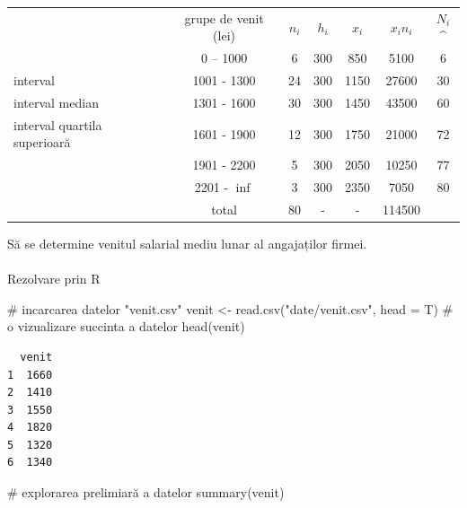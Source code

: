 \documentclass[
  11pt,
  b5paper,
  nottoc]{book}
\makeatletter
\let\oldparagraph\paragraph
\renewcommand{\paragraph}{
    \@ifstar
      \xxxParagraphStar
      \xxxParagraphNoStar
  }
\newcommand{\xxxParagraphStar}[1]{\oldparagraph*{#1}\mbox{}}
\newcommand{\xxxParagraphNoStar}[1]{\oldparagraph{#1}\mbox{}}
\newenvironment{Shaded}{\begin{snugshade}}{\end{snugshade}}
\newcommand{\AttributeTok}[1]{\textcolor[rgb]{0.40,0.45,0.13}{#1}}
\newcommand{\CommentTok}[1]{\textcolor[rgb]{0.37,0.37,0.37}{#1}}
\newcommand{\FunctionTok}[1]{\textcolor[rgb]{0.28,0.35,0.67}{#1}}
\newcommand{\NormalTok}[1]{\textcolor[rgb]{0.00,0.23,0.31}{#1}}
\newcommand{\OtherTok}[1]{\textcolor[rgb]{0.00,0.23,0.31}{#1}}
\newcommand{\StringTok}[1]{\textcolor[rgb]{0.13,0.47,0.30}{#1}}
\makeatother
\begin{document}
\begin{table}[]
\begin{tabular}{lcccccc}
                             & grupe de venit (lei) & $n_i$ & $h_i$ & $x_i$ & $x_i n_i$ & $N_i$\^ \\                              & 0 – 1000             & 6     & 300   & 850   & 5100      & 6       \\
interval                     & 1001 - 1300          & 24    & 300   & 1150  & 27600     & 30      \\
interval median              & 1301 - 1600          & 30    & 300   & 1450  & 43500     & 60      \\
interval quartila superioară & 1601 - 1900          & 12    & 300   & 1750  & 21000     & 72      \\
                             & 1901 - 2200          & 5     & 300   & 2050  & 10250     & 77      \\
                             & 2201 - $\inf$        & 3     & 300   & 2350  & 7050      & 80      \\
                             & total                & 80    & -     & -     & 114500    &         \\ \end{tabular}
\end{table}

Să se determine venitul salarial mediu lunar al angajaților firmei.

\paragraph{Rezolvare prin R}\label{rezolvare-prin-r}

\begin{Shaded}
\begin{Highlighting}[]
\CommentTok{\# incarcarea datelor "venit.csv"}
\NormalTok{venit }\OtherTok{\textless{}{-}} \FunctionTok{read.csv}\NormalTok{(}\StringTok{"date/venit.csv"}\NormalTok{, }\AttributeTok{head =}\NormalTok{ T)}
\CommentTok{\# o vizualizare succinta a datelor}
\FunctionTok{head}\NormalTok{(venit)}
\end{Highlighting}
\end{Shaded}

\begin{verbatim}
  venit
1  1660
2  1410
3  1550
4  1820
5  1320
6  1340
\end{verbatim}

\begin{Shaded}
\begin{Highlighting}[]
\CommentTok{\# explorarea prelimiară a datelor}
\FunctionTok{summary}\NormalTok{(venit)}
\end{Highlighting}
\end{Shaded}
\end{document}
